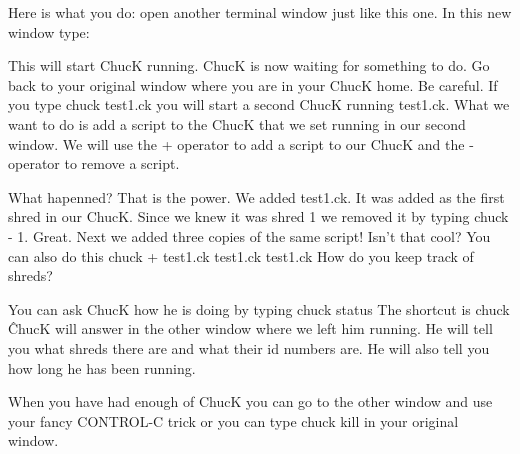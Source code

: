 Here is what you do: open another terminal window just like this one. In this new window type:

This will start ChucK running. ChucK is now waiting for something to do. Go back to your original window where you are in your ChucK home. Be careful. If you type chuck test1.ck you will start a second ChucK running test1.ck. What we want to do is add a script to the ChucK that we set running in our second window. We will use the + operator to add a script to our ChucK and the - operator to remove a script. 


What hapenned? That is the power. We added test1.ck. It was added as the first shred in our ChucK. Since we knew it was shred 1 we removed it by typing chuck - 1. Great. Next we added three copies of the same script! Isn't that cool? You can also do this chuck + test1.ck test1.ck test1.ck How do you keep track of shreds? 

You can ask ChucK how he is doing by typing chuck \doubledash status The shortcut is chuck \^ ChucK will answer in the other window where we left him running. He will tell you what shreds there are and what their id numbers are. He will also tell you how long he has been running. 

When you have had enough of ChucK you can go to the other window and use your fancy CONTROL-C trick or you can type chuck \doubledash kill in your original window.   

